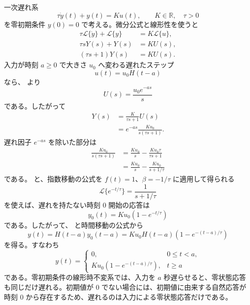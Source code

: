 \begin{example}[遅れたステップ入力に対する一次遅れ応答]
一次遅れ系
\begin{equation}
  \tau\dot{y}(t)+y(t)=K u(t),
  \qquad K\in\mathbb{R},\quad \tau>0
\end{equation}
を零初期条件 $y(0)=0$ で考える。微分公式と線形性を使うと
\begin{align}
  \tau\mathcal{L}\{\dot{y}\}+\mathcal{L}\{y\}
  &=K\mathcal{L}\{u\},\\
  \tau sY(s)+Y(s)&=KU(s),\\
  (\tau s+1)Y(s)&=KU(s).
\end{align}
入力が時刻 $a\ge0$ で大きさ $u_0$ へ変わる遅れたステップ
\begin{equation}
  u(t)=u_0H(t-a)
\end{equation}
なら、 より
\begin{equation}
  U(s)=\frac{u_0e^{-as}}{s}
\end{equation}
である。したがって
\begin{align}
  Y(s)
  &=\frac{K}{\tau s+1}U(s)\\
  &=e^{-as}\frac{K u_0}{s(\tau s+1)}.
  \label{eq:first-order-delayed-step-laplace}
\end{align}
遅れ因子 $e^{-as}$ を除いた部分は
\begin{align}
  \frac{K u_0}{s(\tau s+1)}
  &=
  \frac{K u_0}{s}
  -\frac{K u_0\tau}{\tau s+1}\\
  &=
  \frac{K u_0}{s}
  -\frac{K u_0}{s+1/\tau}
\end{align}
である。 と、指数移動の公式を $f(t)=1$、$\beta=-1/\tau$ に適用して得られる
\begin{equation}
  \mathcal{L}\{e^{-t/\tau}\}=\frac{1}{s+1/\tau}
\end{equation}
を使えば、遅れを持たない時刻 $0$ 開始の応答は
\begin{equation}
  y_0(t)=K u_0\left(1-e^{-t/\tau}\right)
\end{equation}
である。したがって、 と時間移動の公式から
\begin{equation}
  y(t)=H(t-a)y_0(t-a)
  =
  K u_0 H(t-a)
  \left(1-e^{-(t-a)/\tau}\right)
  \label{eq:first-order-delayed-step}
\end{equation}
を得る。すなわち
\begin{equation}
  y(t)=
  \begin{cases}
    0, & 0\le t<a,\\
    K u_0\left(1-e^{-(t-a)/\tau}\right), & t\ge a
  \end{cases}
\end{equation}
である。零初期条件の線形時不変系では、入力を $a$ 秒遅らせると、零状態応答も同じだけ遅れる。初期値が 0 でない場合には、初期値に由来する自然応答が時刻 $0$ から存在するため、遅れるのは入力による零状態応答だけである。
\end{example}

